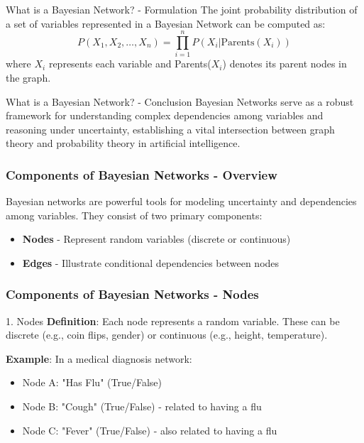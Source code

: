 \documentclass[aspectratio=169]{beamer}
\begin{document}
\begin{frame}[fragile]{What is a Bayesian Network? - Formulation}
    The joint probability distribution of a set of variables represented in a Bayesian Network can be computed as:
    \begin{equation}
        P(X_1, X_2, \ldots, X_n) = \prod_{i=1}^{n} P(X_i | \text{Parents}(X_i))
    \end{equation}
    where \( X_i \) represents each variable and Parents(\(X_i\)) denotes its parent nodes in the graph.
\end{frame}

\begin{frame}[fragile]{What is a Bayesian Network? - Conclusion}
    Bayesian Networks serve as a robust framework for understanding complex dependencies among variables and reasoning under uncertainty, establishing a vital intersection between graph theory and probability theory in artificial intelligence.
\end{frame}

\begin{frame}[fragile]
    \frametitle{Components of Bayesian Networks - Overview}
    Bayesian networks are powerful tools for modeling uncertainty and dependencies among variables. They consist of two primary components:
    \begin{itemize}
        \item \textbf{Nodes} - Represent random variables (discrete or continuous)
        \item \textbf{Edges} - Illustrate conditional dependencies between nodes
    \end{itemize}
\end{frame}

\begin{frame}[fragile]
    \frametitle{Components of Bayesian Networks - Nodes}
    \begin{block}{1. Nodes}
        \textbf{Definition}: Each node represents a random variable. These can be discrete (e.g., coin flips, gender) or continuous (e.g., height, temperature).
    \end{block}
    \textbf{Example}: In a medical diagnosis network:
    \begin{itemize}
        \item Node A: "Has Flu" (True/False)
        \item Node B: "Cough" (True/False) - related to having a flu
        \item Node C: "Fever" (True/False) - also related to having a flu
    \end{itemize}
\end{frame}
\end{document}
